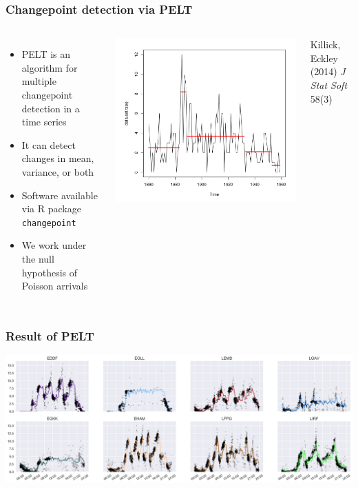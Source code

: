 \documentclass[table,aspectratio=169]{beamer}
\begin{document}
\begin{frame}[t]\frametitle{Changepoint detection via PELT}
    \begin{columns}
        \begin{itemize}
            \item PELT is an algorithm for multiple changepoint detection in a time series
            \item It can detect changes in mean, variance, or both
            \item Software available via R package \texttt{changepoint}
            \item We work under the null hypothesis of Poisson arrivals
        \end{itemize}

        \centering
        \includegraphics[width=.85\textwidth]{pelt}

        {\tiny Killick, Eckley (2014) \emph{J Stat Soft} 58(3)}
    \end{columns}
\end{frame}

\begin{frame}[t]\frametitle{Result of PELT}
    \centering
    \includegraphics[width=\textwidth]{DDPoisson_precluster}
\end{frame}
\end{document}

